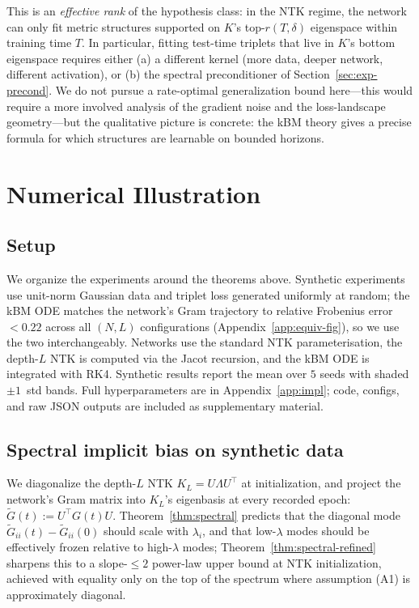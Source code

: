 \documentclass{article}
\newcommand{\Gtilde}{\widetilde{G}}
\begin{document}
This is an \emph{effective rank} of the hypothesis class: in the NTK
regime, the network can only fit metric structures supported on $K$'s
top-$r(T, \delta)$ eigenspace within training time $T$. In particular,
fitting test-time triplets that live in $K$'s bottom eigenspace requires
either (a) a different kernel (more data, deeper network, different
activation), or (b) the spectral preconditioner of
Section~\ref{sec:exp-precond}. We do not pursue a rate-optimal
generalization bound here---this would require a more involved analysis
of the gradient noise and the loss-landscape geometry---but the
qualitative picture is concrete: the kBM theory gives a precise
formula for which structures are learnable on bounded horizons.

\section{Numerical Illustration}
\label{sec:experiments}

\subsection{Setup}

We organize the experiments around the theorems above. Synthetic
experiments use unit-norm Gaussian data and triplet loss generated
uniformly at random; the kBM ODE matches the network's Gram trajectory
to relative Frobenius error $<0.22$ across all $(N,L)$ configurations
(Appendix~\ref{app:equiv-fig}), so we use the two interchangeably.
Networks use the standard NTK parameterisation, the depth-$L$ NTK
is computed via the Jacot recursion, and the kBM ODE is integrated
with RK4. Synthetic results report the mean over $5$ seeds with shaded
$\pm 1$~std bands. Full hyperparameters are in
Appendix~\ref{app:impl}; code, configs, and raw JSON outputs are
included as supplementary material.

\subsection{Spectral implicit bias on synthetic data}
\label{sec:exp-spectral}

We diagonalize the depth-$L$ NTK $K_L = U\Lambda U^\top$ at initialization,
and project the network's Gram matrix into $K_L$'s eigenbasis at every
recorded epoch: $\Gtilde(t) := U^\top G(t) U$. Theorem~\ref{thm:spectral}
predicts that the diagonal mode $\Gtilde_{ii}(t) - \Gtilde_{ii}(0)$ should
scale with $\lambda_i$, and that low-$\lambda$ modes should be effectively
frozen relative to high-$\lambda$ modes; Theorem~\ref{thm:spectral-refined}
sharpens this to a slope-$\leq 2$ power-law upper bound at NTK
initialization, achieved with equality only on the top of the spectrum
where assumption (A1) is approximately diagonal.
\end{document}
